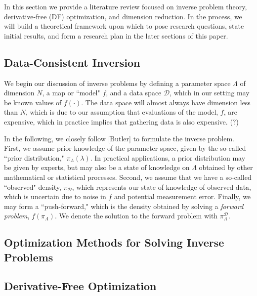 \documentclass{amsart}
\begin{document}
In this section we provide a literature review focused on inverse problem theory, derivative-free (DF) optimization, and dimension reduction. In the process, we will build a theoretical framework upon which to pose research questions, state initial results, and form a research plan in the later sections of this paper.


\subsection{Data-Consistent Inversion}

\vspace{.125cm}

We begin our discussion of inverse problems by defining a parameter space $\Lambda$ of dimension $N$, a map or ``model" $f$, and a data space $\mathcal{D}$, which in our setting may be known values of $f(\cdot)$. The data space will almost always have dimension less than $N$, which is due to our assumption that evaluations of the model, $f$, are expensive, which in practice implies that gathering data is also expensive. (?) 

\noindent In the following, we closely follow [Butler] to formulate the inverse problem. First, we assume prior knowledge of the parameter space, given by the so-called ``prior distribution," $\pi_\Lambda(\lambda)$. In practical applications, a prior distribution may be given by experts, but may also be a state of knowledge on $\Lambda$ obtained by other mathematical or statistical processes. Second, we assume that we have a so-called ``observed" density, $\pi_\mathcal{D}$, which represents our state of knowledge of observed data, which is uncertain due to noise in $f$ and potential measurement error. Finally, we may form a ``push-forward," which is the density obtained by solving a \textit{forward problem}, $f\left(\pi_\Lambda \right)$. We denote the solution to the forward problem with $\pi_\Lambda^\mathcal{D}$.

\subsection{Optimization Methods for Solving Inverse Problems}

\subsection{Derivative-Free Optimization}
\end{document}

